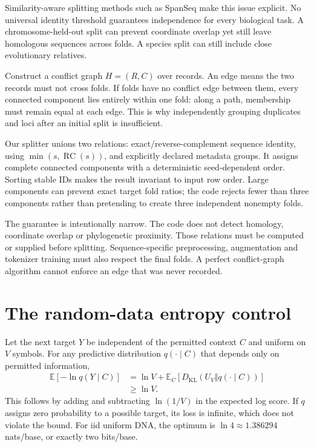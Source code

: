 Similarity-aware splitting methods such as SpanSeq make this issue explicit.\cite{e2spanseq} No universal identity threshold guarantees independence for every biological task. A chromosome-held-out split can prevent coordinate overlap yet still leave homologous sequences across folds. A species split can still include close evolutionary relatives.


Construct a conflict graph $H=(R,C)$ over records. An edge means the two records must not cross folds. If folds have no conflict edge between them, every connected component lies entirely within one fold: along a path, membership must remain equal at each edge. This is why independently grouping duplicates and loci after an initial split is insufficient.

Our splitter unions two relations: exact/reverse-complement sequence identity, using $\min(s,\operatorname{RC}(s))$, and explicitly declared metadata groups. It assigns complete connected components with a deterministic seed-dependent order. Sorting stable IDs makes the result invariant to input row order. Large components can prevent exact target fold ratios; the code rejects fewer than three components rather than pretending to create three independent nonempty folds.

The guarantee is intentionally narrow. The code does not detect homology, coordinate overlap or phylogenetic proximity. Those relations must be computed or supplied before splitting. Sequence-specific preprocessing, augmentation and tokenizer training must also respect the final folds. A perfect conflict-graph algorithm cannot enforce an edge that was never recorded.

\section{The random-data entropy control}
Let the next target $Y$ be independent of the permitted context $C$ and uniform on $V$ symbols. For any predictive distribution $q(\cdot\mid C)$ that depends only on permitted information,
\begin{align}
\mathbb E[-\ln q(Y\mid C)]
&=\ln V+
\mathbb E_C\!\left[D_{\mathrm{KL}}(U_V\Vert q(\cdot\mid C))\right]\\
&\ge\ln V.
\label{eq:e2entropy}
\end{align}
This follows by adding and subtracting $\ln(1/V)$ in the expected log score. If $q$ assigns zero probability to a possible target, its loss is infinite, which does not violate the bound. For iid uniform DNA, the optimum is $\ln4\approx1.386294$ nats/base, or exactly two bits/base.

